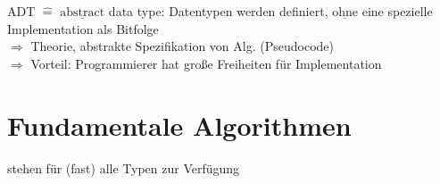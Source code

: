 \begin{itemize}[label={-}]
\begin{itemize}[label={-}]
\begin{figure}[htbp]
\begin{minipage}[t]{6cm}
            \end{minipage}
        \end{figure}

        ADT $\widehat{=}$ $\underline{\text{abstract}}$ data type: Datentypen werden definiert, $\underline{\text{ohne}}$ eine spezielle Implementation als Bitfolge \\

        $\Rightarrow$ Theorie, abstrakte Spezifikation von Alg. (Pseudocode) \\
        $\Rightarrow$ Vorteil: Programmierer hat große Freiheiten für Implementation

        \end{itemize}
\end{itemize}

\section{Fundamentale Algorithmen}
stehen für (fast) alle Typen zur Verfügung
